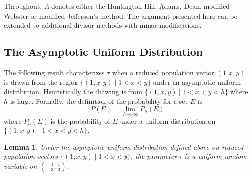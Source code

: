 \documentclass[11pt]{article}
\newtheorem{lemma}[theorem]{Lemma}
\theoremstyle{definition}
\theoremstyle{definition}
\begin{document}
Throughout, $A$ denotes either the Huntington-Hill, Adams, Dean, modified Webster or modified Jefferson's method. The argument presented here can be extended to additional divisor methods with minor modifications. 

\subsection{The Asymptotic Uniform Distribution}
The following result characterizes $\tau$ when a reduced population vector $(1,x,y)$ is drawn from the region $\{(1,x,y) \mid 1<x<y \}$ under an asymptotic uniform distribution. Heuristically the drawing is from $\{(1,x,y) \mid 1<x<y<h \}$ where $h$ is large. Formally, the definition of the probability for a set $E$ is
$$ P(E) =
\lim_{h\to\infty} P_h(E)
$$
where $P_h(E)$ is the probability of $E$ under a uniform distribution on $\{(1,x,y) \mid 1<x<y<h\}$. 

\begin{lemma}\label{prob_given_tau_uniform} Under the asymptotic uniform distribution defined above on reduced population vectors $\{(1,x,y) \mid 1<x<y \}$, the parameter $\tau$ is a uniform random variable on $\left( -\frac{1}{3}, \frac{1}{3}\right)$. \end{lemma}
\end{document}
